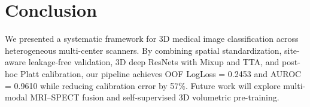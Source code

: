 \section{Conclusion}
\label{sec:conclusion}

We presented a systematic framework for 3D medical image classification across heterogeneous multi-center scanners. By combining spatial standardization, site-aware leakage-free validation, 3D deep ResNets with Mixup and TTA, and post-hoc Platt calibration, our pipeline achieves OOF LogLoss = 0.2453 and AUROC = 0.9610 while reducing calibration error by 57\%. Future work will explore multi-modal MRI--SPECT fusion and self-supervised 3D volumetric pre-training.